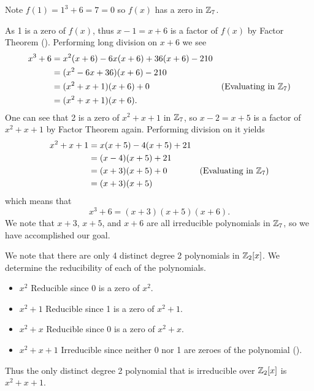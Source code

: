\begin{questions}
    \item \begin{partquestions}{\roman*}
        \item Note $f(1) = 1^3 + 6 = 7 = 0$ so $f(x)$ has a zero in $\mathbb{Z}_7$.

        \item As 1 is a zero of $f(x)$, thus $x-1 = x+6$ is a factor of $f(x)$ by Factor Theorem (). Performing long division on $x+6$ we see
        \begin{align*}
            x^3 + 6 &= x^2(x+6) - 6x(x+6) + 36(x+6) - 210\\
            &= (x^2-6x+36)(x+6) - 210\\
            &= (x^2+x+1)(x+6) + 0 & (\text{Evaluating in }\mathbb{Z}_7)\\
            &= (x^2+x+1)(x+6).
        \end{align*}
        One can see that 2 is a zero of $x^2 + x + 1$ in $\mathbb{Z}_7$, so $x - 2 = x+5$ is a factor of $x^2 + x + 1$ by Factor Theorem again. Performing division on it yields
        \begin{align*}
            x^2 + x + 1 &= x(x+5) - 4(x+5) + 21\\
            &= (x-4)(x+5) + 21\\
            &= (x+3)(x+5) + 0 & (\text{Evaluating in }\mathbb{Z}_7)\\
            &= (x+3)(x+5)
        \end{align*}
        which means that
        \[
            x^3 + 6 = (x+3)(x+5)(x+6).
        \]
        We note that $x+3$, $x+5$, and $x+6$ are all irreducible polynomials in $\mathbb{Z}_7$, so we have accomplished our goal.
    \end{partquestions}

    \item \begin{partquestions}{\alph*}
        \item We note that there are only 4 distinct degree 2 polynomials in $\mathbb{Z}_2[x]$. We determine the reducibility of each of the polynomials.
        \begin{itemize}
            \item $\boxed{x^2}$ Reducible since 0 is a zero of $x^2$.
            \item $\boxed{x^2 + 1}$ Reducible since 1 is a zero of $x^2 + 1$.
            \item $\boxed{x^2+x}$ Reducible since 0 is a zero of $x^2 + x$.
            \item $\boxed{x^2+x+1}$ Irreducible since neither 0 nor 1 are zeroes of the polynomial ().
        \end{itemize}
        Thus the only distinct degree 2 polynomial that is irreducible over $\mathbb{Z}_2[x]$ is $x^2+x+1$.


\end{partquestions}
\end{questions}
